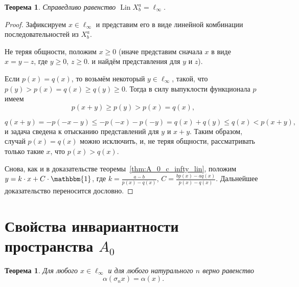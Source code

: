 \documentclass[a4paper,14pt]{article} %
\theoremstyle{plain}
\newtheorem{theorem}[lemma]{Теорема}
\begin{document}
\begin{theorem}
	\label{thm:Lin_ell_infty}
	Справедливо равенство $\operatorname{Lin} X^a_b = \ell_\infty$.
\end{theorem}

\begin{proof}
	Зафиксируем $x \in \ell_\infty$ и представим его в виде линейной комбинации последовательностей из $X^a_b$.

	Не теряя общности, положим $x\geq 0$
	(иначе представим сначала $x$ в виде $x = y - z$, где $y \geq 0$, $z \geq 0$.
	и найдём представления для $y$ и $z$).

	Если $p(x) = q(x)$, то возьмём некоторый $y\in\ell_\infty$,
	такой, что $p(y) > p(x) = q(x)  \geq q(y) \geq 0$.
	Тогда в силу выпуклости функционала $p$ имеем
	\begin{equation}
		p(x+y) \geq p(y) > p(x) = q(x)
		,
	\end{equation}


	\begin{equation}
		q(x+y) = -p(-x-y) \leq -p(-x) -p(-y) = q(x) + q(y) \leq q(x) < p(x+y)
		,
	\end{equation}
	и задача сведена к отысканию представлений для $y$ и $x+y$.
	Таким образом, случай $p(x) = q(x)$ можно исключить,
	и, не теряя общности, рассматривать только такие $x$, что $p(x) > q(x)$.

	Снова, как и в доказательстве теоремы~\ref{thm:A_0_c_infty_lin},
	положим $y=k\cdot x + C\cdot\mathbbm{1}$,
	где $k=\frac{a-b}{p(x)-q(x)}$, $C=\frac{bp(x)-aq(x)}{p(x)-q(x)}$.
	Дальнейшее доказательство переносится дословно.
\end{proof}



\section{Свойства инвариантности пространства $A_0$}

\begin{theorem}
	\label{thm:alpha_sigma_n}
	Для любого $x\in\ell_\infty$ и для любого натурального $n$ верно равенство
	\begin{equation}
		\alpha(\sigma_n x) = \alpha(x)
		.
	\end{equation}
\end{theorem}
\end{document}
